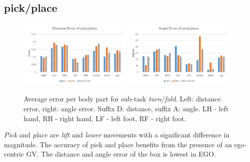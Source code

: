 \subsection{pick/place}
\begin{figure}[H]
	\centering
	\includegraphics[width=0.49\textwidth]{figures/distanceErrorPickPlace.png}
	\includegraphics[width=0.49\textwidth]{figures/angleErrorPickPlace.png}
	\caption[Average error per body part for sub-task \textit{turn}/\textit{fold}.]{Average error per body part for sub-task \textit{turn}/\textit{fold}. Left: distance error, right: angle error. Suffix D: distance, suffix A: angle. LH - left hand, RH - right hand, LF - left foot, RF - right foot.}
	\label{fig:errorPickPlace}
\end{figure}
\textit{Pick} and \textit{place} are \textit{lift} and \textit{lower} movements with a significant difference in magnitude. The accuracy of pick and place benefits from the presence of an ego-centric GV. The distance and angle error of the box is lowest in EGO.

